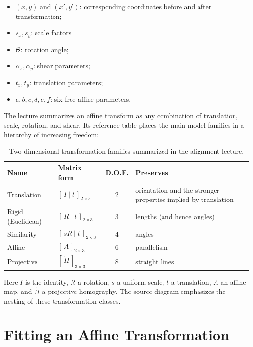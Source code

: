 \documentclass[11pt,a4paper,oneside]{report}
\newcommand{\mathlegend}[1]{%
  \par\vspace{0.2em}{\small\itshape where}\par
  \begin{itemize}[leftmargin=1.7em,topsep=0.15em,itemsep=0.12em]
  #1
  \end{itemize}
}
\begin{document}
\mathlegend{
  \item $(x,y)$ and $(x',y')$: corresponding coordinates before and after transformation;
  \item $s_x,s_y$: scale factors;
  \item $\Theta$: rotation angle;
  \item $\alpha_x,\alpha_y$: shear parameters;
  \item $t_x,t_y$: translation parameters;
  \item $a,b,c,d,e,f$: six free affine parameters.
}
The lecture summarizes an affine transform as any combination of translation, scale, rotation, and shear. Its reference table places the main model families in a hierarchy of increasing freedom:
\begin{table}[!htbp]
\centering
\caption{Two-dimensional transformation families summarized in the alignment lecture.}
\label{tab:alignment-transform-families}
\small
\begin{tabularx}{\textwidth}{@{}l l c X@{}}
\toprule
\textbf{Name} & \textbf{Matrix form} & \textbf{D.O.F.} & \textbf{Preserves}\\
\midrule
Translation & $[\,I\mid t\,]_{2\times3}$ & 2 & orientation and the stronger properties implied by translation\\
Rigid (Euclidean) & $[\,R\mid t\,]_{2\times3}$ & 3 & lengths (and hence angles)\\
Similarity & $[\,sR\mid t\,]_{2\times3}$ & 4 & angles\\
Affine & $[\,A\,]_{2\times3}$ & 6 & parallelism\\
Projective & $[\,\widetilde H\,]_{3\times3}$ & 8 & straight lines\\
\bottomrule
\end{tabularx}
\end{table}
Here $I$ is the identity, $R$ a rotation, $s$ a uniform scale, $t$ a translation, $A$ an affine map, and $\widetilde H$ a projective homography. The source diagram emphasizes the nesting of these transformation classes.

\section{Fitting an Affine Transformation}
\end{document}
